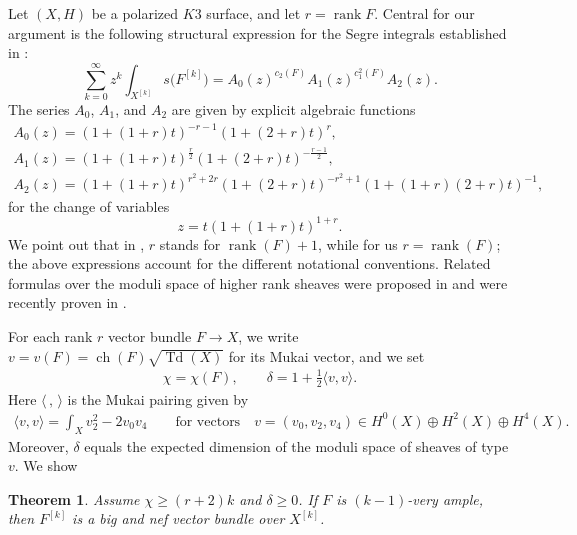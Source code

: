 \documentclass[pdftex]{sigma}
\numberwithin{equation}{section}
\newtheorem{Theorem}{Theorem}[section]
\begin{document}
Let $(X, H)$ be a polarized $K3$ surface, and let $r= \operatorname{rank}F$. Central for our argument is the following structural expression for the Segre integrals established in \cite{MOP}: \begin{equation}\label{eq1}
\sum_{k=0}^{\infty} z^k \int_{X^{[k]}} s \big(F^{[k]}\big) = A_0(z)^{c_2(F)} A_1(z)^{c_1^2(F)} A_2(z).
\end{equation}
{\samepage
The series $A_0$, $A_1$, and $A_2$ are given by explicit algebraic functions
\begin{gather}
A_0(z)= (1+(1+r)t)^{-r-1} (1 + (2+r) t)^{r}, \nonumber
\\
A_1 (z)= (1+(1+r)t)^{\frac{r}{2}} (1 + (2+r) t)^{-\frac{r-1}{2}},\nonumber
\\
A_2 (z)= (1+(1+r)t)^{r^2+2r} (1 + (2+r)t)^{-r^2+1} (1 + (1+r)(2+r)t)^{-1},\label{aaa}
\end{gather}
for the change of variables
\begin{equation*}
z = t (1+(1+r)t)^{1+r}.
\end{equation*}}
We point out that in \cite{MOP}, $r$ stands for $\operatorname{rank}(F) + 1$, while for us $r=\operatorname{rank}(F)$; the above expressions account for the different notational conventions. Related formulas over the moduli space of higher rank sheaves were proposed in \cite{GK} and were recently proven in \cite{Ob}.

For each rank $r$ vector bundle $F\to X$, we write $v=v(F)=\operatorname{ch} (F) \sqrt{\operatorname{Td}(X)}$ for its Mukai vector, and we set
\begin{gather*}
\chi=\chi(F),\qquad \delta=1+\frac{1}{2}\langle v, v\rangle.
\end{gather*}
Here $\langle\,,\, \rangle$ is the Mukai pairing given by
\begin{gather*}
\langle v, v\rangle =\int_{X} v_2^2-2v_0v_4 \qquad
\text{for vectors}\quad v=(v_0, v_2, v_4)\in H^{0}(X)\oplus H^2(X)\oplus H^4(X).
\end{gather*}
Moreover, $\delta$ equals the expected dimension of the moduli space of sheaves of type $v$.
We show
\begin{Theorem}\label{tt}
Assume $\chi \geq (r+2) k$ and $\delta \geq 0$.
If $F$ is $(k-1)$-very ample, then $F^{[k]}$ is a big and nef vector bundle over $X^{[k]}$.
\end{Theorem}
\end{document}
